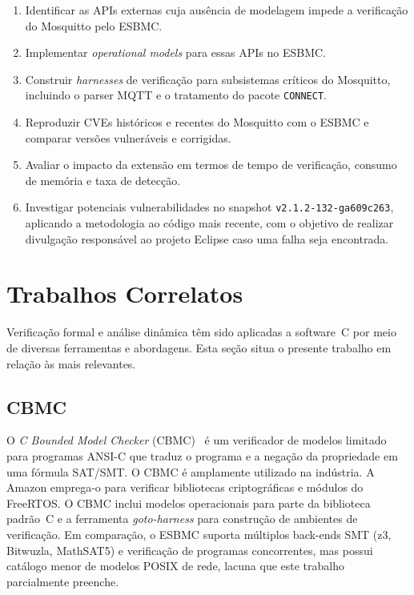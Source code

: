 \documentclass[conference]{IEEEtran}
\newcommand{\mosqsnapshot}{\texttt{v2.1.2-132-ga609c263}}
\begin{document}
\begin{enumerate}
    \item Identificar as APIs externas cuja aus\^encia de modelagem impede a verifica\c{c}\~ao do Mosquitto pelo ESBMC.

    \item Implementar \emph{operational models} para essas APIs no ESBMC.

    \item Construir \emph{harnesses} de verifica\c{c}\~ao para subsistemas cr\'iticos do Mosquitto, incluindo o parser MQTT e o tratamento do pacote \texttt{CONNECT}.

    \item Reproduzir CVEs hist\'oricos e recentes do Mosquitto com o ESBMC e comparar vers\~oes vulner\'aveis e corrigidas.

    \item Avaliar o impacto da extens\~ao em termos de tempo de verifica\c{c}\~ao,
          consumo de mem\'oria e taxa de detec\c{c}\~ao.

    \item Investigar potenciais vulnerabilidades no snapshot \mosqsnapshot,
          aplicando a metodologia ao c\'odigo mais recente, com o
          objetivo de realizar divulga\c{c}\~ao respons\'avel ao projeto Eclipse
          caso uma falha seja encontrada.
\end{enumerate}

\section{Trabalhos Correlatos}
\label{sec:correlatos}

Verifica\c{c}\~ao formal e an\'alise din\^amica t\^em sido aplicadas a software~C por
meio de diversas ferramentas e abordagens. Esta se\c{c}\~ao situa o presente trabalho
em rela\c{c}\~ao \`as mais relevantes.

\subsection{CBMC}
O \emph{C Bounded Model Checker} (CBMC)~\cite{cbmc2004} \'e um verificador de
modelos limitado para programas ANSI-C que traduz o programa e a nega\c{c}\~ao da
propriedade em uma f\'ormula SAT/SMT. O CBMC \'e amplamente utilizado na
ind\'ustria. A Amazon emprega-o para verificar bibliotecas criptogr\'aficas e
m\'odulos do FreeRTOS. O CBMC inclui modelos operacionais para parte da
biblioteca padr\~ao~C e a ferramenta \emph{goto-harness} para constru\c{c}\~ao de
ambientes de verifica\c{c}\~ao. Em compara\c{c}\~ao, o ESBMC suporta m\'ultiplos
back-ends SMT (z3, Bitwuzla, MathSAT5) e verifica\c{c}\~ao de programas
concorrentes, mas possui cat\'alogo menor de modelos POSIX de rede, lacuna que
este trabalho parcialmente preenche.
\end{document}
